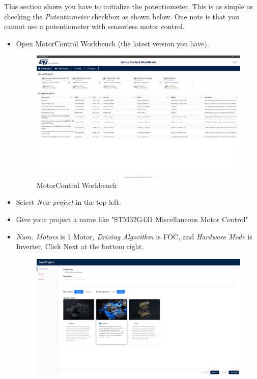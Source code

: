\documentclass[10pt]{article}
\begin{document}
            This section shows you have to initialize the potentiometer. This is as simple as checking the \emph{Potentiometer} checkbox as shown below. One note is that you cannot use a potentiometer with sensorless motor control.
            \begin{itemize}
                \item Open MotorControl Workbench (the latest version you have). 
                    \begin{figure}[H]
                        \centerline{\includegraphics[width=\textwidth]{References/MC Workbench.png}}
                        \caption{MotorControl Workbench}
                    \end{figure}
                \item Select \emph{New project} in the top left.
                \item Give your project a name like "STM32G431 Miscellaneous Motor Control"
                \item \emph{Num. Motors} is 1 Motor, \emph{Driving Algorithm} is FOC, and \emph{Hardware Mode} is Inverter. Click Next at the bottom right.
                    \begin{figure}[H]
                        \centerline{\includegraphics[width=\textwidth]{References/MCW Miscellaneous New Project.png}}

\end{figure}
\end{itemize}
\end{document}
